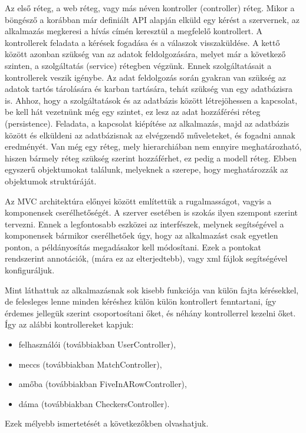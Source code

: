 Az első réteg, a web réteg, vagy más néven kontroller (controller) réteg. Mikor a böngésző a korábban már definiált API alapján elküld egy kérést a szervernek, az alkalmazás megkeresi a hívás címén keresztül a megfelelő kontrollert. A kontrollerek feladata a kérések fogadása és a válaszok visszaküldése.  A kettő között azonban szükség van az adatok feldolgozására, melyet már a következő szinten, a szolgáltatás (service) rétegben végzünk. Ennek szolgáltatásait a kontrollerek veszik igénybe. Az adat feldolgozás során gyakran van szükség az adatok tartós tárolására és karban tartására, tehát szükség van egy adatbázisra is. Ahhoz, hogy a szolgáltatások és az adatbázis között létrejöhessen a kapcsolat, be kell hát vezetnünk még egy szintet, ez lesz az adat hozzáférési réteg (persistence). Feladata, a kapcsolat kiépítése az alkalmazás, majd az adatbázis között és elküldeni az adatbázisnak az elvégzendő műveleteket, és fogadni annak eredményét. Van még egy réteg, mely hierarchiában nem ennyire meghatározható, hiszen bármely réteg szükség szerint hozzáférhet, ez pedig a modell réteg. Ebben egyszerű objektumokat találunk, melyeknek a szerepe, hogy meghatározzák az objektumok struktúráját.

Az MVC architektúra előnyei között említettük a rugalmasságot, vagyis a komponensek cserélhetőségét. A szerver esetében is szokás ilyen szempont szerint tervezni. Ennek a legfontosabb eszközei az interfészek, melynek segítségével a komponensek bármikor cserélhetőek úgy, hogy az alkalmazást csak egyetlen ponton, a példányosítás megadásakor kell módosítani. Ezek a pontokat rendszerint annotációk, (mára ez az elterjedtebb), vagy xml fájlok segítségével konfiguráljuk.

Mint láthattuk az alkalmazásnak sok kisebb funkciója van külön fajta kérésekkel, de felesleges lenne minden kéréshez külön külön kontrollert fenntartani, így érdemes jellegük szerint csoportosítani őket, és néhány kontrollerrel kezelni őket. Így az alábbi kontrollereket kapjuk:
\begin{itemize}
	\item felhasználói (továbbiakban UserController),
	\item meccs (továbbiakban MatchController),
	\item amőba (továbbiakban FiveInARowController),
	\item dáma (továbbiakban CheckersController).
\end{itemize}
Ezek mélyebb ismertetését a következőkben olvashatjuk.

